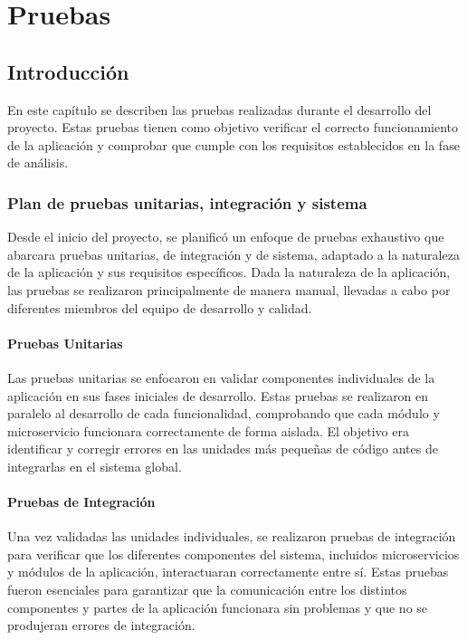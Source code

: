 \chapter{Pruebas}
\label{chap:pruebas}

\section{Introducción}
\label{sec:introduccion_pruebas}

En este capítulo se describen las pruebas realizadas durante el desarrollo del proyecto. Estas pruebas tienen como
objetivo verificar el correcto funcionamiento de la aplicación y comprobar que cumple con los requisitos establecidos
en la fase de análisis. 

\subsection{Plan de pruebas unitarias, integración y sistema}
\label{subsec:plan_pruebas}

Desde el inicio del proyecto, se planificó un enfoque de pruebas exhaustivo que abarcara pruebas unitarias, 
de integración y de sistema, adaptado a la naturaleza de la aplicación y sus requisitos específicos. Dada la naturaleza
de la aplicación, las pruebas se realizaron principalmente de manera manual, llevadas a 
cabo por diferentes miembros del equipo de desarrollo y calidad.

\subsubsection{Pruebas Unitarias}
Las pruebas unitarias se enfocaron en validar componentes individuales de la aplicación en sus fases iniciales de desarrollo. 
Estas pruebas se realizaron en paralelo al desarrollo de cada funcionalidad, comprobando que cada módulo y microservicio funcionara 
correctamente de forma aislada. El objetivo era identificar y corregir errores en las unidades más pequeñas de código antes de 
integrarlas en el sistema global.

\subsubsection{Pruebas de Integración}
Una vez validadas las unidades individuales, se realizaron pruebas de integración para verificar que los diferentes componentes 
del sistema, incluidos microservicios y módulos de la aplicación, interactuaran correctamente entre sí. Estas pruebas fueron 
esenciales para garantizar que la comunicación entre los distintos componentes y partes de la aplicación funcionara sin problemas
y que no se produjeran errores de integración. 

